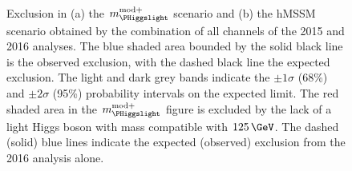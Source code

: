 \begin{figure}[h!]
\begin{center}
~\\
\end{center}
\caption[Exclusion in the $m_{\PHiggslight}^{\text{mod+}}$ scenario and the hMSSM
scenario of the combination of the 2015 and 2016 \AHtotautau analyses.]{Exclusion in (a) the $m_{\PHiggslight}^{\text{mod}+}$ scenario and (b) the hMSSM scenario 
obtained by the combination
of all channels of the 2015 and 2016 \AHtotautau analyses. The blue shaded area bounded by the 
solid black line is the observed exclusion, with the dashed black line the
expected exclusion. The light and dark grey bands indicate
the $\pm 1\sigma$ (68\%) and $\pm 2\sigma$ (95\%) probability intervals on the expected limit.
The red shaded area in the $m_{\PHiggslight}^{\text{mod}+}$ figure
is excluded by the lack of a light Higgs boson with mass compatible with $125\,\GeV$. The dashed (solid)
blue lines indicate the expected (observed) exclusion from the 2016 analysis alone.}
\label{fig:mssm_mhmodp_20152016}
\end{figure}





